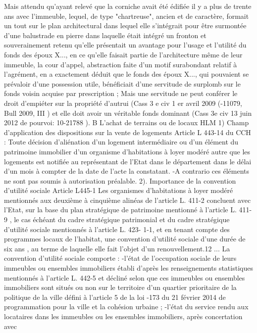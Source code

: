 \documentclass[11pt,a4paper]{report}
\begin{document}
	Mais attendu qu'ayant relevé que la corniche avait été édifiée il y a plus de trente ans avec l'immeuble, lequel, de
	type "chartreuse", ancien et de caractère, formait un tout sur le plan architectural dans lequel elle s'intégrait
	pour être surmontée d'une balustrade en pierre dans laquelle était intégré un fronton et souverainement retenu
	qu'elle présentait un avantage pour l'usage et l'utilité du fonds des époux X..., en ce qu'elle faisait partie de
	l'architecture même de leur immeuble, la cour d'appel, abstraction faite d'un motif surabondant relatif à
	l'agrément, en a exactement déduit que le fonds des époux X..., qui pouvaient se prévaloir d'une possession utile,
	bénéficiait d'une servitude de surplomb sur le fonds voisin acquise par prescription ;
	Mais une servitude ne peut conférer le droit d’empiéter sur la propriété d’autrui (Cass 3 e civ 1 er avril 2009 (-11079, Bull 2009, III ) et elle doit avoir un véritable fonds dominant (Cass 3e civ 13 juin 2012 \No  de
	pourvoi: 10-21788 ).
	B L’achat de terrains ou de locaux HLM
	1) Champ d’application des dispositions sur la vente de logements
	Article L 443-14 du CCH : Toute décision d'aliénation d'un logement intermédiaire ou d'un élément du
	patrimoine immobilier d'un organisme d'habitations à loyer modéré autre que les logements est notifiée au
	représentant de l'Etat dans le département dans le délai d'un mois à compter de la date de l'acte la constatant.
	-A contrario ces éléments ne sont pas soumis à autorisation préalable.
	2). Importance de la convention d’utilité sociale
	Article L445-1
	Les organismes d'habitations à loyer modéré mentionnés aux deuxième à cinquième alinéas de l'article L. 411-2
	concluent avec l'Etat, sur la base du plan stratégique de patrimoine mentionné à l'article L. 411-9 , le cas
	échéant du cadre stratégique patrimonial et du cadre stratégique d'utilité sociale mentionnés à l'article L. 423-
	1-1, et en tenant compte des programmes locaux de l'habitat, une convention d'utilité sociale d'une durée de six
	ans , au terme de laquelle elle fait l'objet d'un renouvellement.12
	...
	La convention d'utilité sociale comporte :
	-l'état de l'occupation sociale de leurs immeubles ou ensembles immobiliers établi d'après les renseignements
	statistiques mentionnés à l'article L. 442-5 et décliné selon que ces immeubles ou ensembles immobiliers sont
	situés ou non sur le territoire d'un quartier prioritaire de la politique de la ville défini à l'article 5 de la loi -173 du 21 février 2014 de programmation pour la ville et la cohésion urbaine ;
	-l'état du service rendu aux locataires dans les immeubles ou les ensembles immobiliers, après concertation avec
\end{document}
